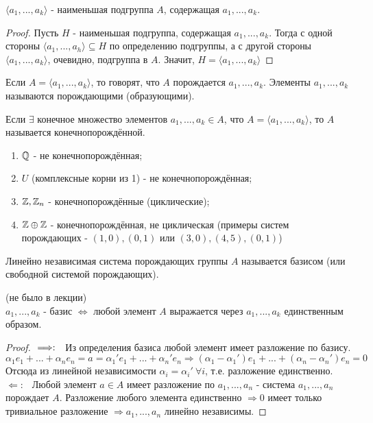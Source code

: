 \begin{subtheorem}
    $\langle a_1,...,a_k \rangle$ - наименьшая подгруппа $A$, содержащая $a_1,...,a_k$. 
\end{subtheorem}
\begin{proof}
    Пусть $H$ - наименьшая подгруппа, содержащая $a_1,...,a_k$. Тогда с одной стороны $\langle a_1,...,a_h \rangle \subseteq H$ по определению подгруппы, а с другой стороны $\langle a_1,...,a_k\rangle$, очевидно, подгруппа в $A$. Значит, $H = \langle a_1,...,a_k \rangle$ 
\end{proof}
\begin{definition}
    Если $A = \langle a_1,...,a_k \rangle$, то говорят, что $A$ порождается $a_1,...,a_k$. Элементы $a_1,...,a_k$ называются порождающими (образующими).
\end{definition}
\begin{definition}
    Если $\exists$ конечное множество элементов $a_1,...,a_k \in A$, что $A = \langle a_1,...,a_k \rangle$, то $A$ называется конечнопорождённой.
\end{definition}
\begin{examples}\tab
    \begin{enumerate}
        \item $\mathbb{Q}$ - не конечнопорождённая;
        \item $U$ (комплексные корни из 1) - не конечнопорождённая;
        \item $\mathbb{Z}, \mathbb{Z}_n$ - конечнопорождённые (циклические);
        \item $\mathbb{Z} \oplus \mathbb{Z}$ - конечнопорождённая, не циклическая (примеры систем порождающих - $(1, 0), (0, 1)$ или $(3, 0), (4, 5), (0, 1)$) 
    \end{enumerate}
\end{examples}
\begin{definition}
    Линейно независимая система порождающих группы $A$ называется базисом (или свободной системой порождающих).
\end{definition}
\begin{subtheorem} (не было в лекции)\\
    $a_1,...,a_k$ - базис $\Longleftrightarrow$ любой элемент $A$ выражается через $a_1,...,a_k$ единственным образом.
\end{subtheorem}
\begin{proof}
    $ \\ \Longrightarrow: \ \ $ Из определения базиса любой элемент имеет разложение по базису.
    \[\alpha_1e_1 + ... + \alpha_ne_n = a = \alpha_1'e_1 + ... + \alpha_n'e_n \Longrightarrow (\alpha_1 - \alpha_1')e_1 + ... + (\alpha_n - \alpha_n')e_n = 0\] 
    Отсюда из линейной независимости $\alpha_i = \alpha_i' \ \forall i$, т.е. разложение единственно.\\
    $\Longleftarrow: \ \ $ Любой элемент $a \in A$ имеет разложение по $a_1,...,a_n$ - система $a_1,...,a_n$ порождает $A$. Разложение любого элемента единственно $\Longrightarrow 0$ имеет только тривиальное разложение $\Longrightarrow a_1,...,a_n$ линейно независимы. 
\end{proof}
